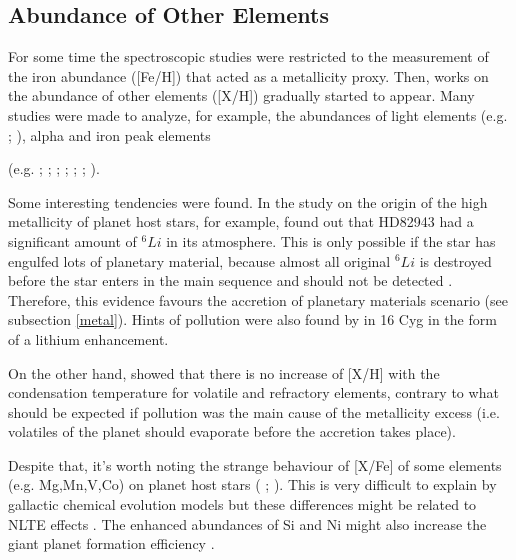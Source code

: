 \documentclass[dvips,12pt,a4paper]{report}
\begin{document}

\subsection {Abundance of Other Elements} %
\label {others}

For some time the spectroscopic studies were restricted to the measurement of the iron abundance ([Fe/H]) that acted as a metallicity proxy. Then, works on the abundance of other elements ([X/H]) gradually started to appear.
Many studies were made to analyze, for example, the abundances of light elements (e.g. \citeauthor{Sandquist-2002} \citeyear{Sandquist-2002}; \citeauthor{Israelian-2003} \citeyear{Israelian-2003}), alpha and iron peak elements {(e.g.  \citeauthor{Gonzalez-2001} \citeyear{Gonzalez-2001}; \citeauthor{Takeda-2001} \citeyear{Takeda-2001}; \citeauthor{Ecuvillon-2004b} \citeyear{Ecuvillon-2004b}; \citeauthor{Fischer-2005} \citeyear{Fischer-2005}; \citeauthor{Bodaghee-2003} \citeyear{Bodaghee-2003}; \citeauthor{Beirao-2005} \citeyear{Beirao-2005}; \citeauthor{Gilli-2006} \citeyear{Gilli-2006}). 

Some interesting tendencies were found. In the study on the origin of the high metallicity of planet host stars, for example, \citet{Israelian-2003} found out that HD82943 had a significant amount of $^6Li$ in its atmosphere. This is only possible if the star has engulfed lots of planetary material, because almost all original $^6Li$ is destroyed before the star enters in the main sequence and should not be detected \citep{Sandquist-2002}. Therefore, this evidence favours the accretion of planetary materials scenario (see subsection \ref{metal}). Hints of pollution were also found by \citet{Laws-2001} in 16 Cyg  in the form of a lithium enhancement.

On the other hand, \citet{Ecuvillon-2006b} showed that there is no increase of [X/H] with the condensation temperature for volatile and refractory elements, contrary to what should be expected if pollution was the main cause of the metallicity excess (i.e. volatiles of the planet should evaporate before the accretion takes place).

Despite that, it's worth noting the strange behaviour of [X/Fe] of some elements (e.g. Mg,Mn,V,Co) on planet host stars (\citeauthor{Bodaghee-2003} \citeyear{Bodaghee-2003}; \citeauthor{Gilli-2006} \citeyear{Gilli-2006}). This is very difficult to explain by gallactic chemical evolution models but these differences might be related to NLTE effects \citep{Bodaghee-2003}. The enhanced abundances of Si and Ni might also increase the giant planet formation efficiency \citep{Robinson-2006}.

}
\end{document}
